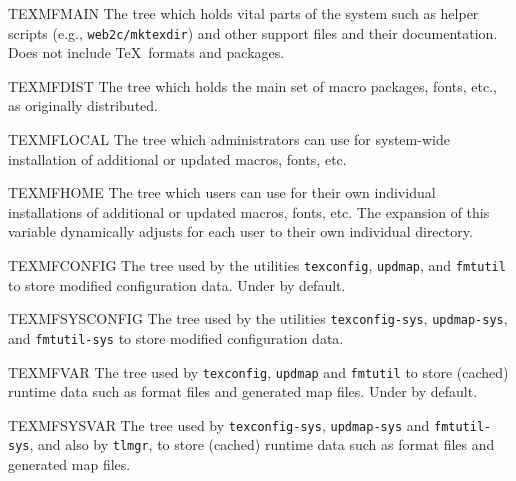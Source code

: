 \documentclass{article}
\begin{document}
\begin{ttdescription}
\item [TEXMFMAIN] The tree which holds vital parts of the system
  such as helper scripts (e.g., \verb+web2c/mktexdir+) and other
  support files and their documentation.  Does not include
  \TeX\ formats and packages.
\item [TEXMFDIST] The tree which holds the main set of macro packages,
  fonts, etc., as originally distributed.
\item [TEXMFLOCAL] The tree which administrators can use for system-wide
  installation of additional or updated macros, fonts, etc.
\item [TEXMFHOME] The tree which users can use for their own individual
  installations of additional or updated macros, fonts, etc.
  The expansion of this variable dynamically adjusts for each user to
  their own individual directory.
\item [TEXMFCONFIG] The tree used by the utilities
  \verb+texconfig+, \verb+updmap+, and \verb+fmtutil+ to store modified
  configuration data.  Under  by default.
\item [TEXMFSYSCONFIG] The tree used by the utilities
  \verb+texconfig-sys+, \verb+updmap-sys+, and \verb+fmtutil-sys+ to
  store modified configuration data.
\item [TEXMFVAR] The tree used by \verb+texconfig+, \verb+updmap+ and
  \verb+fmtutil+ to store (cached) runtime data such as format files and
  generated map files.  Under  by default.
\item [TEXMFSYSVAR] The tree used by \verb+texconfig-sys+,
  \verb+updmap-sys+ and \verb+fmtutil-sys+, and also by \verb+tlmgr+, to
  store (cached) runtime data such as format files and generated map files.
\end{ttdescription}
\end{document}
